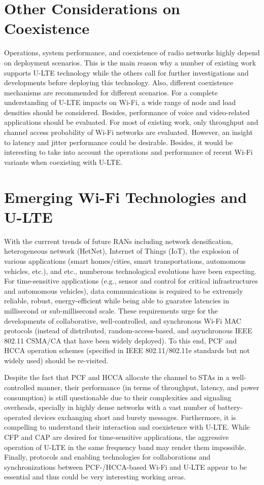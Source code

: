 \section{Other Considerations on Coexistence}
Operations, system performance, and coexistence of radio networks highly depend on deployment scenarios. This is the main reason why a number of existing work supports U-LTE technology while the others call for further investigations and developments before deploying this technology. Also, different coexistence mechanisms are recommended for different scenarios. For a complete understanding of U-LTE impacts on Wi-Fi, a wide range of node and load densities should be considered. Besides, performance of voice and video-related applications should be evaluated. For most of existing work, only throughput and channel access probability of Wi-Fi networks are evaluated. However, an insight to latency and jitter performance could be desirable. Besides, it would be interesting to take into account the operations and performance of recent Wi-Fi variants when coexisting with U-LTE.

\section{Emerging Wi-Fi Technologies and U-LTE}
With the currrent trends of future RANs including network densification, heterogeneous network (HetNet), Internet of Things (IoT), the explosion of various applications (smart homes/cities, smart transportations, automomous vehicles, etc.), and etc., numberous technological evolutions have been expecting. For time-sensitive applications (e.g., sensor and control for critical infrastructures and automomous vehicles), data communications is required to be extremely reliable, robust, energy-efficient while being able to guaratee latencies in millisecond or sub-millisecond scale. These requirements urge for the developments of collaborative, well-controlled, and synchronous Wi-Fi MAC protocols (instead of distributed, random-access-based, and asynchronous IEEE 802.11 CSMA/CA that have been widely deployed). To this end, PCF and HCCA operation schemes (specified in IEEE 802.11/802.11e standards but not widely used) should be re-visited.

Despite the fact that PCF and HCCA allocate the channel to STAs in a well-controlled manner, their performance (in terms of throughput, latency, and power consumption) is still questionable due to their complexities and signaling overheads, specially in highly dense networks with a vast number of battery-operated devices exchanging short and bursty messages. Furthermore, it is compelling to understand their interaction and coexistence with U-LTE. While CFP and CAP are desired for time-sensitive applications, the aggressive operation of U-LTE in the same frequency band may render them impossible. Finally, protocols and enabling technologies for collaborations and synchronizations between PCF-/HCCA-based Wi-Fi and U-LTE appear to be essential and thus could be very interesting working areas.

